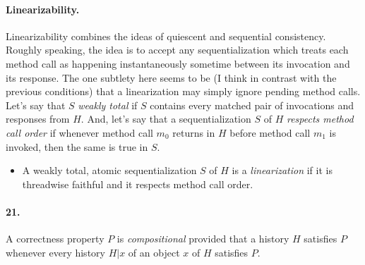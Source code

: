 \documentclass[
]{article}
\begin{document}
\paragraph{Linearizability.}
Linearizability combines the ideas of quiescent and sequential consistency.  Roughly speaking, the idea is to accept any sequentialization which treats each method call as happening instantaneously sometime between its invocation and its response.  The one subtlety here seems to be (I think in contrast with the previous conditions) that a linearization may simply ignore pending method calls.  Let's say that $S$ \emph{weakly total} if $S$ contains every matched pair of invocations and responses from $H$.  And, let's say that a sequentialization $S$ of $H$ \emph{respects method call order} if whenever method call $m_0$ returns in $H$ before method call $m_1$ is invoked, then the same is true in $S$.  
\begin{itemize}
\item[] A weakly total, atomic sequentialization $S$ of $H$ is a \emph{linearization} if it is threadwise faithful and it respects method call order.
\end{itemize}




\paragraph{21.} A correctness property $P$ is \emph{compositional} provided that a history $H$ satisfies $P$ whenever every history $H|x$ of an object $x$ of $H$ satisfies $P$.
\end{document}
